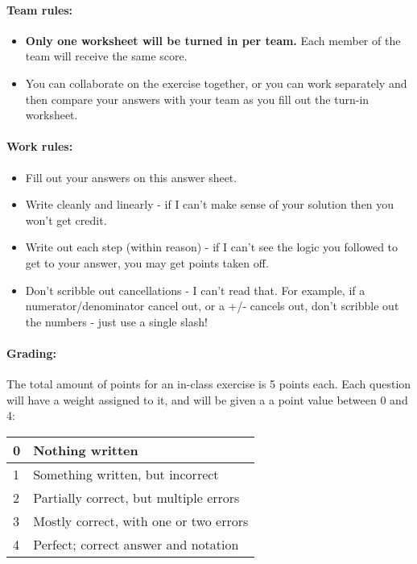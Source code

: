 \documentclass[a4paper,12pt]{book}
\begin{document}
    \paragraph{Team rules:}

    \begin{itemize}
        \item \textbf{Only one worksheet will be turned in per team.}
            Each member of the team will receive the same score.
        \item You can collaborate on the exercise together, or you can
            work separately and then compare your answers with your team
            as you fill out the turn-in worksheet.
    \end{itemize}

    \paragraph{Work rules:}

    \begin{itemize}
        \item Fill out your answers on this answer sheet.
        \item Write cleanly and linearly - if I can't make sense of
            your solution then you won't get credit.
        \item Write out each step (within reason) - if I can't see the
            logic you followed to get to your answer, you may get points taken off.
        \item Don't scribble out cancellations - I can't read that.
            For example, if a numerator/denominator cancel out, or a +/-
            cancels out, don't scribble out the numbers - just use a single slash!
    \end{itemize}

    \paragraph{Grading:}
        The total amount of points for an in-class exercise is 5 points each.
        Each question will have a weight assigned to it, and will be given
        a a point value between 0 and 4:

    \begin{center}
        \begin{tabular}{ | l | l | }
            \hline
            0 & Nothing written \\ \hline
            1 & Something written, but incorrect \\ \hline
            2 & Partially correct, but multiple errors \\ \hline
            3 & Mostly correct, with one or two errors \\ \hline
            4 & Perfect; correct answer and notation \\ \hline
            
        \end{tabular}
    \end{center}
    
\end{document}
